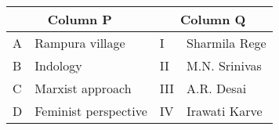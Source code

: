 \begin{tabular}{|ll|ll|}
        \hline
        \multicolumn{2}{|c|}{\textbf{Column P}} & \multicolumn{2}{c|}{\textbf{Column Q}} \\
        \hline
        A & Rampura village & I & Sharmila Rege \\
        B & Indology & II & M.N. Srinivas \\
        C & Marxist approach & III & A.R. Desai \\
        D & Feminist perspective & IV & Irawati Karve \\
        \hline
    \end{tabular}
